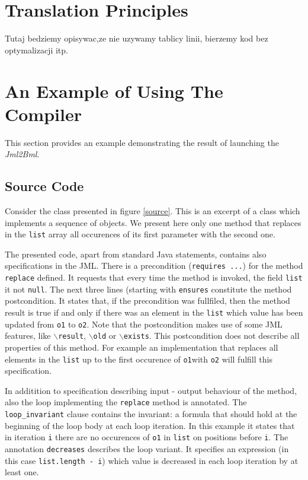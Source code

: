 \documentclass{acm_proc_article-sp}
\begin{document}
\section{Translation Principles}
Tutaj bedziemy opisywac,ze nie uzywamy tablicy linii, bierzemy kod bez optymalizacji itp.
\section{An Example of Using The\\Compiler}
This section provides an example demonstrating the result of launching the \textit{Jml2Bml}.
\subsection{Source Code}
Consider the class presented in figure \ref{source}. This is an excerpt of a class which implements a sequence of objects. We present here only one method that replaces in the \texttt{list} array all occurences of its first parameter with the second one.

The presented code, apart from standard Java statements, contains also specifications in the JML. There is a precondition (\texttt{requires ...}) for the method \texttt{replace} defined. It requests that every time the method is invoked, the field \texttt{list} it not \texttt{null}. The next three lines (starting with \texttt{ensures} constitute the method postcondition. It states that, if the precondition was fullfiled, then the method result is true if and only if there was an element in the \texttt{list} which value has been updated from \texttt{o1} to \texttt{o2}. Note that the postcondition makes use of some JML features, like \texttt{$\backslash$result}, \texttt{$\backslash$old} or \texttt{$\backslash$exists}. This postcondition does not describe all properties of this method. For example an implementation that replaces all elements in the \texttt{list} up to the first occurence of \texttt{o1}with \texttt{o2} will fulfill this specification.

In additition to specification describing input - output behaviour of the method, also the loop implementing the \texttt{replace} method is annotated. The \texttt{loop\_invariant} clause contains the invariant: a formula that should hold at the beginning of the loop body at each loop iteration. In this example it states that in iteration \texttt{i} there are no occurences of \texttt{o1} in \texttt{list} on positions before \texttt{i}. The annotation \texttt{decreases} describes the loop variant. It specifies an expression (in this case \texttt{list.length - i}) which value is decreased in each loop iteration by at least one.
\end{document}
